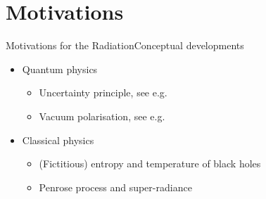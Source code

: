 \documentclass{beamer}
\begin{document}

\section{Motivations}

\begin{frame}{Motivations for the Radiation}{Conceptual developments}

\begin{itemize}
\item Quantum physics
	\begin{itemize}
	\item Uncertainty principle, see e.g.\ \cite{susskind2008black}
	\item Vacuum polarisation, see e.g.\ \cite{Frolov1998}
	\end{itemize}
\item Classical physics
	\begin{itemize}
		\item (Fictitious) entropy and temperature of black holes
		\cite{Bekenstein1973,Bekenstein1980}
		\item Penrose process and super-radiance
	\end{itemize}
\end{itemize}

\end{frame}
\end{document}
